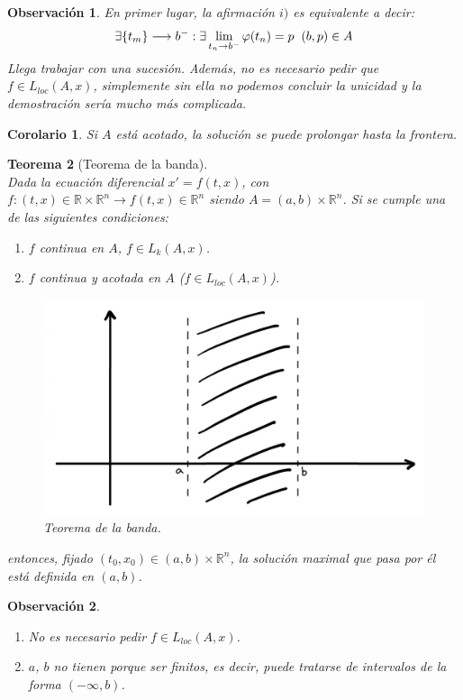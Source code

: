 \documentclass[11pt, a4paper,twoside]{article}
\theoremstyle{theorem-style}  %
\newtheorem{theorem}{Teorema}[section]  %
\newtheorem{corollary}[theorem]{Corolario} %
\theoremstyle{definition-style}
\newtheorem*{observation}{Observación} %
\theoremstyle{example-style}
\begin{document}
\begin{observation}
	En primer lugar, la afirmación $i)$ es equivalente a decir:
	\[\exists \{t_m\} \longrightarrow b^- : \exists \lim\limits_{t_n \to b^-} \varphi(t_n) = p \hspace{0.2cm} (b, p) \in A\]
	Llega trabajar con una sucesión. Además, no es necesario pedir que $f \in L_{loc}(A, x)$, simplemente sin ella no podemos concluir la unicidad y la demostración sería mucho más complicada.
\end{observation}
\begin{corollary}
	Si $A$ está acotado, la solución se puede prolongar hasta la frontera.
\end{corollary}
\begin{theorem}[Teorema de la banda]\label{banda} \ \\ 
	Dada la ecuación diferencial $x' = f(t, x)$, con $f: (t, x) \in \mathbb{R} \times \mathbb{R}^n \longrightarrow f(t, x) \in \mathbb{R}^n$ siendo $A = (a, b) \times \mathbb{R}^n$. Si se cumple una de las siguientes condiciones:
	\begin{enumerate}
		\item  $f$ continua en $A$, $f \in L_k (A, x)$.
		\item  $f$ continua y acotada en $A$ ($f \in L_{loc} (A, x)$).
	\end{enumerate}
	
	\begin{figure}[h]
		\centering
		\includegraphics[scale=0.3]{banda}
		\caption{Teorema de la banda.}
	\end{figure}
	
	entonces, fijado $(t_0, x_0) \in (a, b) \times \mathbb{R}^n$, la solución maximal que pasa por él está definida en $(a, b)$.
\end{theorem}
\begin{observation} \ 
	\begin{enumerate}
		\item No es necesario pedir $f \in L_{loc} (A, x)$.
		\item $a$, $b$ no tienen porque ser finitos, es decir, puede tratarse de intervalos de la forma $(- \infty, b)$.
	\end{enumerate}
\end{observation}
\end{document}
